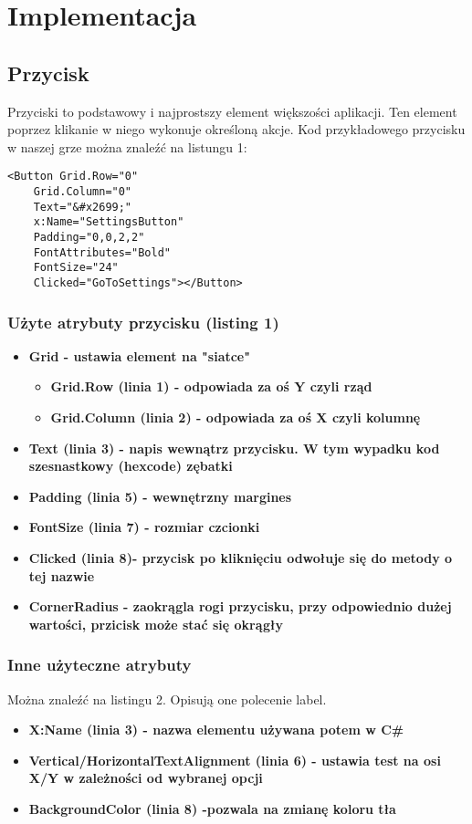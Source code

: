 	\newpage
\section{Implementacja}		%

\subsection{Przycisk}
\hspace{0.60cm}Przyciski to podstawowy i najprostszy element większości aplikacji. Ten element poprzez klikanie w niego wykonuje określoną akcje. Kod przykładowego przycisku w naszej grze można znaleźć na listungu 1:

\begin{lstlisting}[caption=Button]
	<Button Grid.Row="0" 
	Grid.Column="0" 
	Text="&#x2699;" 
	x:Name="SettingsButton" 
	Padding="0,0,2,2" 
	FontAttributes="Bold"  
	FontSize="24" 
	Clicked="GoToSettings"></Button>
\end{lstlisting}

\subsubsection{Użyte atrybuty przycisku (listing 1)}
\begin{itemize}	
	\item \textbf{Grid - ustawia element na "siatce"}
	\begin{itemize}
	\item \textbf{Grid.Row (linia 1) - odpowiada za oś Y czyli rząd }
	\item \textbf{Grid.Column (linia 2) - odpowiada za oś X czyli kolumnę}	
	\end{itemize}
	\item \textbf{Text (linia 3) - napis wewnątrz przycisku. W tym wypadku kod szesnastkowy (hexcode) zębatki}
	\item \textbf{Padding (linia 5) - wewnętrzny margines}
	\item \textbf{FontSize (linia 7) - rozmiar czcionki}
	\item \textbf{Clicked (linia 8)- przycisk po kliknięciu odwołuje się do metody o tej nazwie}
	\item \textbf{CornerRadius - zaokrągla rogi przycisku, przy odpowiednio dużej wartości, przicisk może stać się okrągły}

	
\end{itemize}
\subsubsection{Inne użyteczne atrybuty}
\hspace{0.60cm}Można znaleźć na listingu 2. Opisują one polecenie label.
\begin{itemize}
	\item \textbf{X:Name (linia 3) - nazwa elementu używana potem w C\#}	
	\item \textbf{Vertical/HorizontalTextAlignment (linia 6) - ustawia test na osi X/Y w zależności od wybranej opcji}
	\item \textbf{BackgroundColor (linia 8) -pozwala na zmianę koloru tła }		
\end{itemize}


